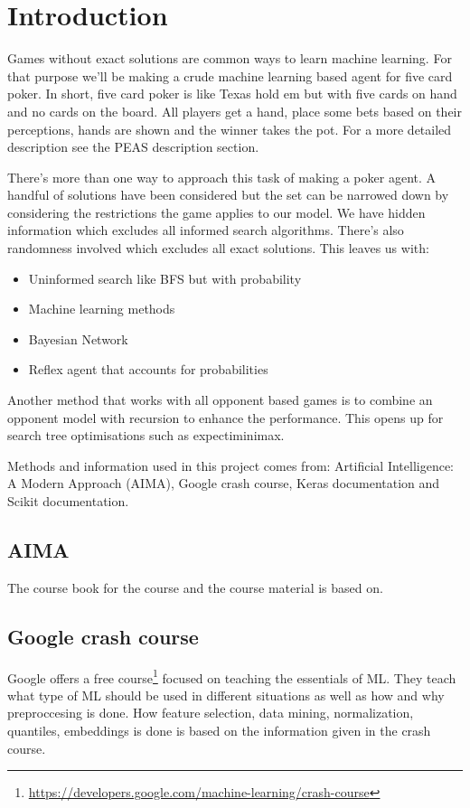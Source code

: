 \documentclass[../main.tex]{subfiles}
\begin{document}
\section{Introduction}
Games without exact solutions are common ways to learn machine learning. For that purpose we'll be making a crude machine learning based agent for five card poker. In short, five card poker is like Texas hold em but with five cards on hand and no cards on the board. All players get a hand, place some bets based on their perceptions, hands are shown and the winner takes the pot. For a more detailed description see the PEAS description section. 

There's more than one way to approach this task of making a poker agent. A handful of solutions have been considered but the set can be narrowed down by considering the restrictions the game applies to our model. We have hidden information which excludes all informed search algorithms. There's also randomness involved which excludes all exact solutions. This leaves us with:

\begin{itemize}
    \item Uninformed search like BFS but with probability
    \item Machine learning methods
    \item Bayesian Network
    \item Reflex agent that accounts for probabilities
\end{itemize}

Another method that works with all opponent based games is to combine an opponent model with recursion to enhance the performance. This opens up for search tree optimisations such as expectiminimax.



Methods and information used in this project comes from: Artificial Intelligence: A Modern Approach (AIMA), Google crash course, Keras documentation and Scikit documentation.

\subsection{AIMA}
The course book \cite{AIMA} for the course and the course material is based on.

\subsection{Google crash course}
Google offers a free course\footnote{\url{https://developers.google.com/machine-learning/crash-course}} focused on teaching the essentials of ML. They teach what type of ML should be used in different situations as well as how and why preproccesing is done. How feature selection, data mining, normalization, quantiles, embeddings is done is based on the information given in the crash course.
\end{document}
